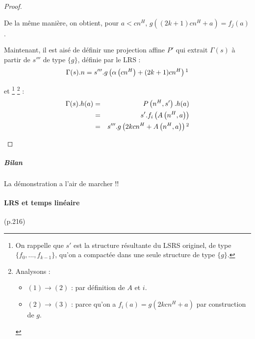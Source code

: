 \documentclass{article}
\begin{document}
\begin{proof}
\begin{enumerate}[itemsep=-1mm,leftmargin=2cm]
					De la même manière, on obtient, pour $a < cn^H$, $g\left( (2k+1)cn^H + a\right) = f_j(a)$. 
					
					Maintenant, il est aisé de définir une projection affine $P'$ qui extrait $\Gamma(s)$ à partir de $s'''$ de type $\{g\}$, définie par le LRS :
					\[
						\Gamma(s).n = s'''.g\left( \alpha\left( cn^H\right) + (2k+1)cn^H\right) \footnotemark
					\]
					
					
					et
						\footnote{On rappelle que $s'$ est la structure résultante du LSRS originel, de type $\{f_0, \dots, f_{k-1}\}$, qu'on a compactée dans une seule structure de type $\{g\}$.}
						\footnote{Analysons :
							\begin{itemize}
								\setlength{\itemsep}{-1mm}
								\item 	$(1) \rightarrow (2)$ : par définition de $A$ et $i$.
								\item 	$(2) \rightarrow (3)$ : parce qu'on a $f_i(a) = g\left( 2kcn^H + a \right)$ par construction de $g$.
							\end{itemize}
							}
					 :
					\setcounter{equation}{0}
					\begin{eqnarray}
						\Gamma(s).h(a) 	& = &	P\left( n^H, s' \right).h(a) \\
										& = &	s'.f_i\left( A\left( n^H, a \right) \right) \\
										& = & 	s'''.g\left( 2kcn^H + A\left( n^H, a \right) \right) \footnotemark
					\end{eqnarray}
					
					
			\end{enumerate}
			
		
	\end{proof}
	
		
		\subparagraph{Bilan}
		La démonstration a l'air de marcher !!
		

	\pagebreak
		
		
	\paragraph{LRS et temps linéaire} (p.216)
	
\end{document}
